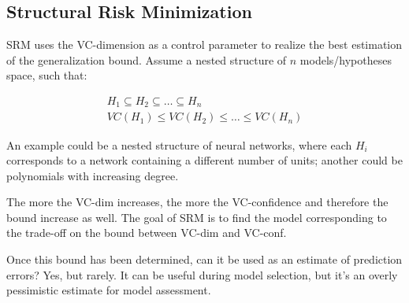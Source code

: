 \subsection{Structural Risk Minimization}

SRM uses the VC-dimension as a control parameter to realize the best estimation of the generalization bound. Assume a nested structure of $n$ models/hypotheses space, such that: 

\begin{gather*}
    H_1 \subseteq H_2 \subseteq \dots \subseteq H_n \\
    VC(H_1) \leq VC(H_2) \leq \dots \leq VC(H_n)
\end{gather*}

An example could be a nested structure of neural networks, where each $H_i$ corresponds to a network containing a different number of units; another could be polynomials with increasing degree.

The more the VC-dim increases, the more the VC-confidence and therefore the bound increase as well. The goal of SRM is to find the model corresponding to the trade-off on the bound between VC-dim and VC-conf.

Once this bound has been determined, can it be used as an estimate of prediction errors? Yes, but rarely. It can be useful during model selection, but it's an overly pessimistic estimate for model assessment.